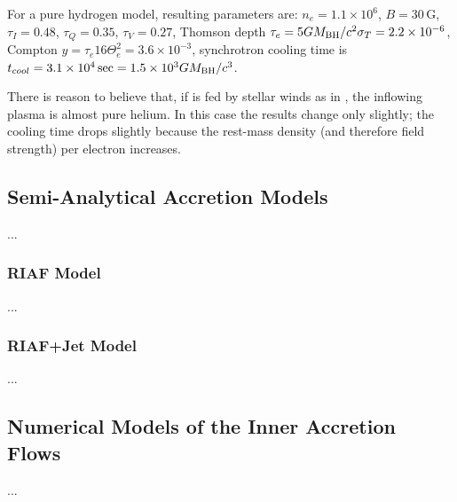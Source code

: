 \documentclass[twocolumn,twocolappendix,tighten,dvipsnames,linenumbers]{aastex63}
\begin{document}
For a pure hydrogen model, resulting parameters are: $n_e = 1.1 \times
10^6$, $B = 30\,\mathrm{G}$, $\tau_I = 0.48$, $\tau_Q = 0.35 $,
$\tau_V = 0.27$, Thomson depth $\tau_e = 5 GM_{\rm BH}/c^2 \sigma_T = 2.2
\times 10^{-6}$, Compton $y = \tau_e 16 \Theta_e^2 = 3.6 \times
10^{-3}$, synchrotron cooling time is $t_{cool} = 3.1 \times 10^4\sec
= 1.5 \times 10^3 GM_{\rm BH}/c^3$.

There is reason to believe that, if \sgra is fed by stellar winds as
in \citet{2019MNRAS.482L.123R}, the inflowing plasma is almost pure
helium.
In this case the results change only slightly; the cooling time drops
slightly because the rest-mass density (and therefore field strength)
per electron increases.

\subsection{Semi-Analytical Accretion Models}

...

\subsubsection{RIAF Model}

...

\subsubsection{RIAF+Jet Model}

...

\subsection{Numerical Models of the Inner Accretion Flows}

...
\end{document}
